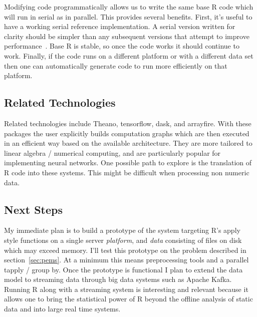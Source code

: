 \documentclass[12pt]{article}
\begin{document}
Modifying code programmatically allows us to write the same base R code
which will run in serial as in parallel. This provides several benefits.
First, it's useful to have a working serial reference implementation.  A
serial version written for clarity should be simpler than any subsequent
versions that attempt to improve performance~\cite{matloff2015parallel}.
Base R is stable, so once the code works it should continue to work.
Finally, if the code runs on a different platform or with a different data
set then one can automatically generate code to run more efficiently on
that platform.

\subsection{Related Technologies}

Related technologies include Theano, tensorflow, dask, and arrayfire. With
these packages the user explicitly builds computation graphs which are then
executed in an efficient way based on the available architecture. They are
more tailored to linear algebra / numerical computing, and are particularly
popular for implementing neural networks. One possible path to explore is
the translation of R code into these systems. This might be difficult when
processing non numeric data.

\subsection{Next Steps}

My immediate plan is to build a prototype of the system targeting R's apply
style functions on a single
server \emph{platform}, and \emph{data} consisting of files on disk which
may exceed memory. I'll test this prototype on the problem described in
section~\ref{sec:pems}. At a minimum this means preprocessing tools
and a parallel tapply / group by.  Once the prototype is functional
I plan to extend the data model to streaming data through big data systems
such as Apache Kafka. Running R along with a streaming system is
interesting and relevant because it allows one to bring the statistical
power of R beyond the offline analysis of static data and into large real
time systems. 


 
\end{document}
